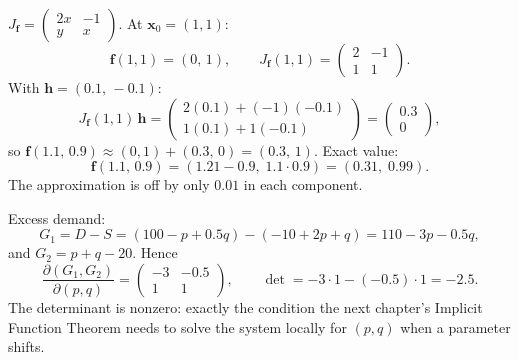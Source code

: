 \begin{solutions}
  \item $J_{\mathbf{f}}=\begin{pmatrix}2x&-1\\y&x\end{pmatrix}$. At
        $\mathbf{x}_{0}=(1,1)$:
        \[
          \mathbf{f}(1,1)=(0,\,1),\qquad
          J_{\mathbf{f}}(1,1)=\begin{pmatrix}2&-1\\1&1\end{pmatrix} .
        \]
        With $\mathbf{h}=(0.1,\,-0.1)$:
        \[
          J_{\mathbf{f}}(1,1)\,\mathbf{h}
            =\begin{pmatrix}2(0.1)+(-1)(-0.1)\\
              1(0.1)+1(-0.1)\end{pmatrix}
            =\begin{pmatrix}0.3\\0\end{pmatrix},
        \]
        so $\mathbf{f}(1.1,\,0.9)\approx(0,1)+(0.3,\,0)=(0.3,\,1)$.
        Exact value:
        \[
          \mathbf{f}(1.1,\,0.9)=(1.21-0.9,\;1.1\cdot 0.9)
            =(0.31,\;0.99) .
        \]
        The approximation is off by only $0.01$ in each component.

  \item Excess demand:
        \[
          G_{1}=D-S=(100-p+0.5q)-(-10+2p+q)=110-3p-0.5q ,
        \]
        and $G_{2}=p+q-20$. Hence
        \[
          \frac{\partial(G_{1},G_{2})}{\partial(p,q)}
            =\begin{pmatrix}-3&-0.5\\1&1\end{pmatrix},\qquad
          \det=-3\cdot 1-(-0.5)\cdot 1=-2.5 .
        \]
        The determinant is nonzero: exactly the condition the next
        chapter's Implicit Function Theorem needs to solve the system
        locally for $(p,q)$ when a parameter shifts.


\end{solutions}
